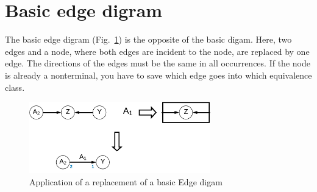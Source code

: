 \documentclass[a4paper]{scrartcl}
\begin{document}
\section{Basic edge digram}

The basic edge digram (Fig.~\ref{fig:basicEdgeDigram}) is the opposite of the basic digam.
Here, two edges and a node, where both edges are incident to the node, are replaced by one edge. The directions of the edges must be the same in all occurrences. If the node is already a nonterminal, you have to save which edge goes into which equivalence class.

\begin{figure}[h]
	\centering
	\includegraphics[width=0.7\textwidth]{img/basicEdgeDigram}
	\caption{Application of a replacement of a basic Edge digam}
	\label{fig:basicEdgeDigram}
\end{figure}




\pagebreak
\printbibliography
\end{document}

